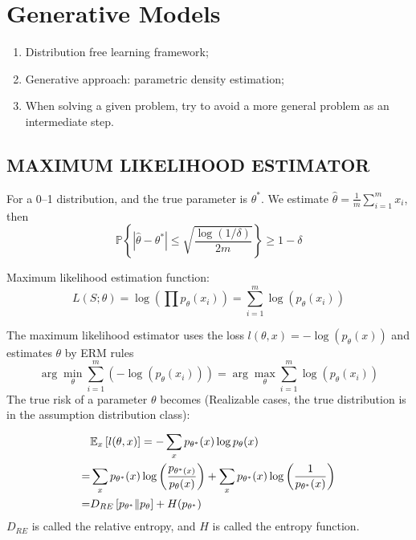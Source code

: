 
\section{Generative Models}%
\label{sec:generative_models}

\begin{enumerate}
    \item Distribution free learning framework;
    \item Generative approach: parametric density estimation;
    \item When solving a given problem, try to avoid a more general problem as an intermediate step.
\end{enumerate}

\subsection{MAXIMUM LIKELIHOOD ESTIMATOR}%
\label{sub:maximum_likelihood_estimator}

For a {0--1} distribution, and the true parameter is $ \theta^* $. We estimate $ \hat \theta = \frac{1}{m} \sum^{m}_{i=1} x_i $, then
\[
    \mathbb{P}\left\{  \left| \hat{\theta} - \theta^* \right| \le \sqrt{\frac{\log(1/\delta)}{2m} } \right\} \ge 1 - \delta
\]

Maximum likelihood estimation function:
\[
    L(S; \theta) = \log \left( \prod p_{\theta}(x_i) \right) = \sum^{m}_{i=1} \log(p_\theta(x_i))
\]

The maximum likelihood estimator uses the loss $ l(\theta, x) = -\log(p_{\theta}(x)) $ and estimates $ \theta $ by ERM rules
\[
    \arg\min_{\theta} \sum^{m}_{i=1} (-\log(p_{\theta}(x_i))) = \arg\max_\theta \sum^{m}_{i=1} \log(p_\theta(x_i))
\]
The true risk of a parameter $ \theta $ becomes (Realizable cases, the true distribution is in the assumption distribution class):
\begin{align*}
    &\mathbb{E}_{x} \left[ l(\theta, x) \right] = - \sum^{}_{x} p_{\theta^*}(x) \log p_{\theta}(x)\\
    =& \sum^{}_{x} p_{\theta^*}(x) \log \left( \frac{p_{\theta^*(x)}}{p_{\theta}(x)}  \right) + \sum^{}_{x} p_{\theta^*}(x) \log \left( \frac{1}{p_{\theta^*}(x)}  \right)\\
    =& D_{RE}\left[ p_{\theta^*} \Arrowvert p_{\theta} \right] + H(p_{\theta^*})
\end{align*}
$ D_{RE} $ is called the relative entropy, and $ H $ is called the entropy function.

